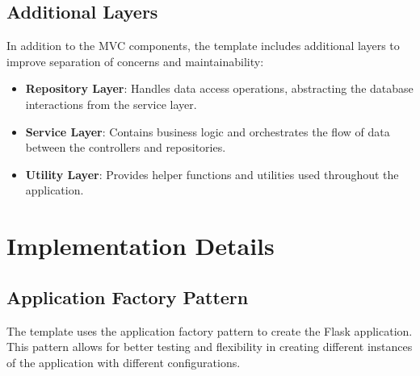 \documentclass{article}
\begin{document}
\subsection{Additional Layers}

In addition to the MVC components, the template includes additional layers to improve separation of concerns and maintainability:

\begin{itemize}
    \item \textbf{Repository Layer}: Handles data access operations, abstracting the database interactions from the service layer.
    \item \textbf{Service Layer}: Contains business logic and orchestrates the flow of data between the controllers and repositories.
    \item \textbf{Utility Layer}: Provides helper functions and utilities used throughout the application.
\end{itemize}


\section{Implementation Details}

\subsection{Application Factory Pattern}

The template uses the application factory pattern to create the Flask application. This pattern allows for better testing and flexibility in creating different instances of the application with different configurations.
\end{document}
